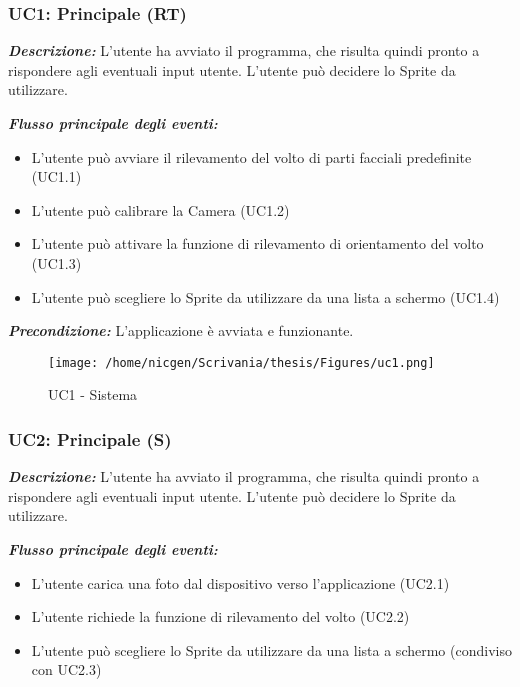 \subsubsection{UC1: Principale (RT)}

\textbf{\textit{Descrizione:}} L'utente ha avviato il programma, che risulta quindi pronto a rispondere agli eventuali input utente. L'utente può decidere lo Sprite da utilizzare.

\textbf{\textit{Flusso principale degli eventi:}} 

\begin{itemize}
\item L'utente può avviare il rilevamento del volto di parti facciali predefinite (UC1.1)
\item L'utente può calibrare la Camera (UC1.2)
\item L'utente può attivare la funzione di rilevamento di orientamento del volto (UC1.3)
\item L'utente può scegliere lo Sprite da utilizzare da una lista a schermo (UC1.4)
\end{itemize}

\textbf{\textit{Precondizione:}} L'applicazione è avviata e funzionante.


\begin{figure}[H]\centering  
\texttt{[image: /home/nicgen/Scrivania/thesis/Figures/uc1.png]}
\caption[UC1 - Sistema]{UC1 - Sistema}
\label{pic-a}
\end{figure}


\subsubsection{UC2: Principale (S)}

\textbf{\textit{Descrizione:}} L'utente ha avviato il programma, che risulta quindi pronto a rispondere agli eventuali input utente. L'utente può decidere lo Sprite da utilizzare.

\textbf{\textit{Flusso principale degli eventi:}} 

\begin{itemize}
\item L'utente carica una foto dal dispositivo verso l'applicazione (UC2.1)
\item L'utente richiede la funzione di rilevamento del volto (UC2.2)
\item L'utente può scegliere lo Sprite da utilizzare da una lista a schermo (condiviso con UC2.3)
\end{itemize}

